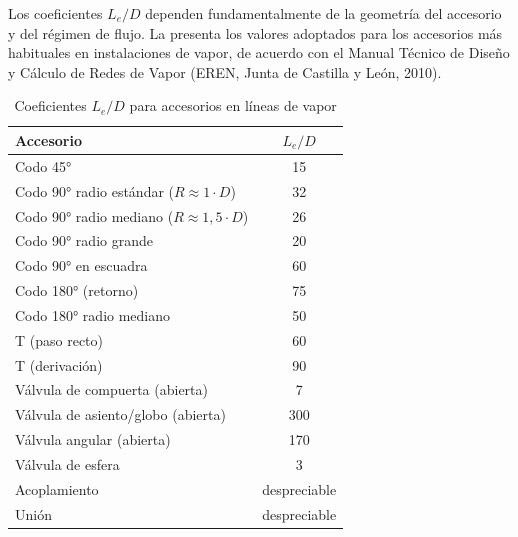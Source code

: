 Los coeficientes $L_e/D$ dependen fundamentalmente de la geometría del accesorio y del régimen de flujo. La  presenta los valores adoptados para los accesorios más habituales en instalaciones de vapor, de acuerdo con el Manual Técnico de Diseño y Cálculo de Redes de Vapor (EREN, Junta de Castilla y León, 2010).

\begin{table}[H]
	\centering
	\caption{Coeficientes $L_e/D$ para accesorios en líneas de vapor}
	\label{tab:coeficientes-LeD-completa}
	\begin{tabular}{lc}
		\toprule
		\textbf{Accesorio}                                 & \textbf{$L_e/D$} \\
		\midrule
		Codo 45°                                           & 15               \\
		Codo 90° radio estándar ($R \approx 1 \cdot D$)    & 32               \\
		Codo 90° radio mediano ($R \approx 1{,}5 \cdot D$) & 26               \\
		Codo 90° radio grande                              & 20               \\
		Codo 90° en escuadra                               & 60               \\
		Codo 180° (retorno)                                & 75               \\
		Codo 180° radio mediano                            & 50               \\
		T (paso recto)                                     & 60               \\
		T (derivación)                                     & 90               \\
		Válvula de compuerta (abierta)                     & 7                \\
		Válvula de asiento/globo (abierta)                 & 300              \\
		Válvula angular (abierta)                          & 170              \\
		Válvula de esfera                                  & 3                \\
		Acoplamiento                                       & despreciable     \\
		Unión                                              & despreciable     \\
		\bottomrule
	\end{tabular}
\end{table}

